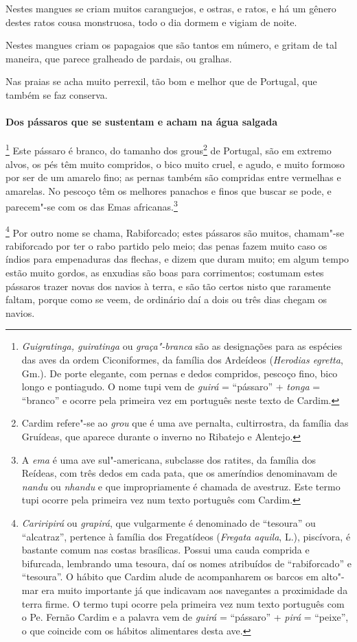  Nestes mangues se criam muitos caranguejos, e ostras, e ratos, e há um
gênero destes ratos cousa monstruosa, todo o dia dormem e vigiam de noite.

 Nestes mangues criam os papagaios que são tantos em número, e gritam de
tal maneira, que parece gralheado de pardais, ou gralhas.

 Nas praias se acha muito perrexil, tão bom e melhor que de Portugal, 
que também se faz conserva.


\paragraph{Dos pássaros que se sustentam e acham na água salgada}

\footnote{ \textit{Guigratinga,
guiratinga} ou \textit{graça"-branca} são as designações para as
espécies das aves da ordem Ciconiformes, da família dos Ardeídeos
(\textit{Herodias egretta}, Gm.). De porte elegante, com pernas e dedos
compridos, pescoço fino, bico longo e pontiagudo. O nome tupi vem de
\textit{guirá} = ``pássaro'' + \textit{tonga} = ``branco'' e ocorre pela
primeira vez em português neste texto de Cardim.} Este
pássaro é branco, do tamanho dos grous\footnote{ Cardim refere"-se ao
\textit{grou} que é uma ave pernalta, cultirrostra, da família das
Gruídeas, que aparece durante o inverno no Ribatejo e Alentejo.} de
Portugal, são em extremo alvos, os pés têm muito compridos, o bico
muito cruel, e agudo, e muito formoso por ser de um amarelo fino; as
pernas também são compridas entre vermelhas e amarelas. No pescoço têm
os melhores panachos e finos que buscar se pode, e parecem"-se com os
das Emas africanas.\footnote{ A \textit{ema} é uma ave sul"-americana,
subclasse dos ratites, da família dos Reídeas, com três dedos em cada
pata, que os ameríndios denominavam de \textit{nandu} ou
\textit{nhandu} e que impropriamente é chamada de avestruz. Este termo
tupi ocorre pela primeira vez num texto português com Cardim.} 

\footnote{ \textit{Cariripirá} ou \textit{grapirá}, 
que vulgarmente é denominado de ``tesoura'' ou ``alcatraz'', pertence à
família dos Fregatídeos (\textit{Fregata aquila}, L.), piscívora, é
bastante comum nas costas brasílicas. Possui uma cauda comprida e
bifurcada, lembrando uma tesoura, daí os nomes atribuídos de
``rabiforcado'' e ``tesoura''. O hábito que Cardim alude de acompanharem os
barcos em alto"-mar era muito importante já que indicavam aos navegantes
a proximidade da terra firme. O termo tupi ocorre pela primeira vez num
texto português com o Pe. Fernão Cardim e a palavra vem de
\textit{guirá} = ``pássaro'' + \textit{pirá} = ``peixe'', o que coincide
com os hábitos alimentares desta ave.} Por outro nome se
chama, Rabiforcado; estes pássaros são muitos, chamam"-se rabiforcado
por ter o rabo partido pelo meio; das penas fazem muito caso os índios
para empenaduras das flechas, e dizem que duram muito; em algum tempo
estão muito gordos, as enxudias são boas para corrimentos; costumam
estes pássaros trazer novas dos navios à terra, e são tão certos nisto
que raramente faltam, porque como se veem, de ordinário daí a dois ou
três dias chegam os navios.

